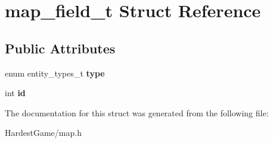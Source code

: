 \hypertarget{structmap__field__t}{}\section{map\+\_\+field\+\_\+t Struct Reference}
\label{structmap__field__t}
\subsection*{Public Attributes}
\begin{DoxyCompactItemize}
\item 
enum entity\+\_\+types\+\_\+t {\bfseries type}\hypertarget{structmap__field__t_abe200b24095a00c913fe802e0347f087}{}\label{structmap__field__t_abe200b24095a00c913fe802e0347f087}

\item 
int {\bfseries id}\hypertarget{structmap__field__t_ad8b5f718ac9ac87381b01bc2a10ed268}{}\label{structmap__field__t_ad8b5f718ac9ac87381b01bc2a10ed268}

\end{DoxyCompactItemize}


The documentation for this struct was generated from the following file\+:\begin{DoxyCompactItemize}
\item 
Hardest\+Game/map.\+h\end{DoxyCompactItemize}
